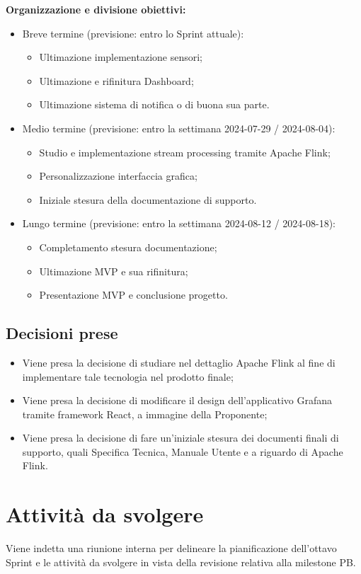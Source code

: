 \documentclass[8pt]{article}
\newcommand{\signatureline}[1]{%
	 \par\vspace{0.5cm}
	\noindent\makebox[\linewidth][r]{\rule{0.2\textwidth}{0.5pt}\hspace{3cm}\makebox[0pt][r]{\vspace{3pt}\footnotesize #1}}%
}
\begin{document}
\textbf{Organizzazione e divisione obiettivi:}
\begin{itemize}
\setlength\itemsep{0em}
    \item Breve termine (previsione: entro lo Sprint attuale):
    \begin{itemize}
    \setlength\itemsep{0em}
        \item Ultimazione implementazione sensori;
        \item Ultimazione e rifinitura Dashboard;
        \item Ultimazione sistema di notifica o di buona sua parte.
    \end{itemize}
    \item Medio termine (previsione: entro la settimana 2024-07-29 / 2024-08-04):
    \begin{itemize}
    \setlength\itemsep{0em}
        \item Studio e implementazione stream processing tramite Apache Flink;
        \item Personalizzazione interfaccia grafica;
        \item Iniziale stesura della documentazione di supporto.
    \end{itemize}
    \item Lungo termine (previsione: entro la settimana 2024-08-12 / 2024-08-18):
    \begin{itemize}
    \setlength\itemsep{0em}
        \item Completamento stesura documentazione;
        \item Ultimazione MVP e sua rifinitura;
        \item Presentazione MVP e conclusione progetto.
    \end{itemize}
\end{itemize}
\subsection{Decisioni prese}
\begin{itemize}
	\setlength\itemsep{0em}
	\item Viene presa la decisione di studiare nel dettaglio Apache Flink al fine di implementare tale tecnologia nel prodotto finale;
	\item Viene presa la decisione di modificare il design dell'applicativo Grafana tramite framework React, a immagine della Proponente;
	\item Viene presa la decisione di fare un'iniziale stesura dei documenti finali di supporto, quali Specifica Tecnica, Manuale Utente e a riguardo di Apache Flink.
\end{itemize}
\newpage
\section{Attività da svolgere}
Viene indetta una riunione interna per delineare la pianificazione dell'ottavo Sprint e le attività da svolgere in vista della revisione relativa alla milestone PB.
\signatureline{Padova, 2024-08-15}
\end{document}
